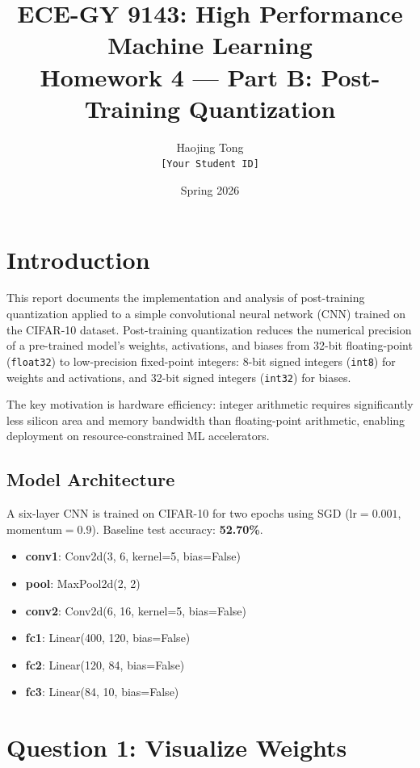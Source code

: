 \documentclass[11pt, letterpaper]{article}
\title{
  \textbf{ECE-GY 9143: High Performance Machine Learning}\\[6pt]
  \large Homework 4 --- Part B: Post-Training Quantization
}
\author{Haojing Tong \\ \texttt{[Your Student ID]}}
\date{Spring 2026}
\begin{document}
\maketitle
\tableofcontents
\newpage

\section{Introduction}

This report documents the implementation and analysis of post-training
quantization applied to a simple convolutional neural network (CNN) trained
on the CIFAR-10 dataset. Post-training quantization reduces the numerical
precision of a pre-trained model's weights, activations, and biases from
32-bit floating-point (\texttt{float32}) to low-precision fixed-point
integers: 8-bit signed integers (\texttt{int8}) for weights and activations,
and 32-bit signed integers (\texttt{int32}) for biases.

The key motivation is hardware efficiency: integer arithmetic requires
significantly less silicon area and memory bandwidth than floating-point
arithmetic, enabling deployment on resource-constrained ML accelerators.

\subsection{Model Architecture}

A six-layer CNN is trained on CIFAR-10 for two epochs using SGD
(lr$=0.001$, momentum$=0.9$). Baseline test accuracy: \textbf{52.70\%}.

\begin{itemize}
  \item \textbf{conv1}: Conv2d(3, 6, kernel=5, bias=False)
  \item \textbf{pool}: MaxPool2d(2, 2)
  \item \textbf{conv2}: Conv2d(6, 16, kernel=5, bias=False)
  \item \textbf{fc1}: Linear(400, 120, bias=False)
  \item \textbf{fc2}: Linear(120, 84, bias=False)
  \item \textbf{fc3}: Linear(84, 10, bias=False)
\end{itemize}

\section{Question 1: Visualize Weights}
\end{document}
